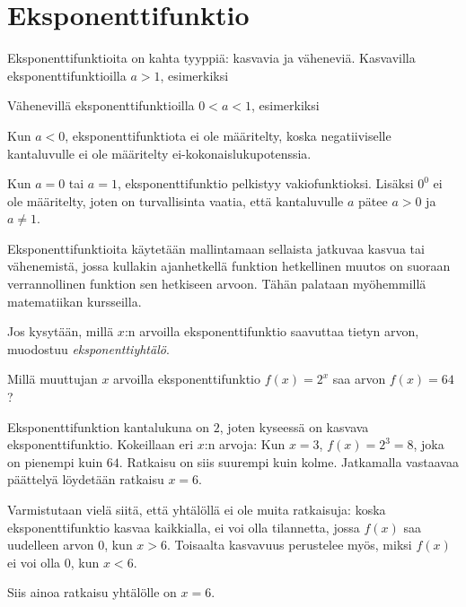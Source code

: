 \chapter{Eksponenttifunktio}


Eksponenttifunktioita on kahta tyyppiä: kasvavia ja väheneviä.
Kasvavilla eksponenttifunktioilla $a>1$, esimerkiksi


Vähenevillä eksponenttifunktioilla $0<a<1$, esimerkiksi


Kun $a<0$, eksponenttifunktiota ei ole määritelty, koska negatiiviselle
kantaluvulle ei ole määritelty ei-kokonaislukupotenssia.

Kun $a=0$ tai $a=1$, eksponenttifunktio pelkistyy vakiofunktioksi.
Lisäksi $0^0$ ei ole määritelty, joten on turvallisinta vaatia, että
kantaluvulle $a$ pätee $a>0$ ja $a \neq 1$.

Eksponenttifunktioita käytetään mallintamaan sellaista
jatkuvaa kasvua tai vähenemistä, jossa kullakin ajanhetkellä
funktion hetkellinen muutos on suoraan verrannollinen funktion sen
hetkiseen arvoon. Tähän palataan myöhemmillä matematiikan kursseilla.

Jos kysytään, millä $x$:n arvoilla eksponenttifunktio saavuttaa tietyn
arvon, muodostuu \emph{eksponenttiyhtälö}. 

\begin{esimerkki}
Millä muuttujan $x$ arvoilla eksponenttifunktio $f(x) = 2^x$ saa arvon
$f(x) = 64$?

Eksponenttifunktion kantalukuna on $2$, joten kyseessä on kasvava
eksponenttifunktio. Kokeillaan eri $x$:n arvoja: Kun $x = 3$,
$f(x) = 2^3 = 8$, joka on pienempi kuin $64$. Ratkaisu on siis
suurempi kuin kolme. Jatkamalla vastaavaa päättelyä löydetään ratkaisu
$x = 6$.

Varmistutaan vielä siitä, että yhtälöllä ei ole muita ratkaisuja:
koska eksponenttifunktio kasvaa kaikkialla, ei voi olla tilannetta, jossa
$f(x)$ saa uudelleen arvon $0$, kun $x > 6$. Toisaalta kasvavuus perustelee
myös, miksi $f(x)$ ei voi olla $0$, kun $x < 6$.

Siis ainoa ratkaisu yhtälölle on $x = 6$.
\end{esimerkki}

